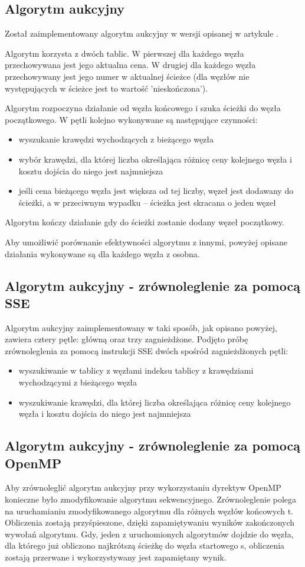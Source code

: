 \documentclass[12pt,a4paper]{article}
\begin{document}
\subsection{Algorytm aukcyjny}
Został zaimplementowany algorytm aukcyjny w wersji opisanej w artykule \cite{auction}.

Algorytm korzysta z dwóch tablic. W pierwszej dla każdego węzła przechowywana jest jego aktualna cena. W drugiej dla każdego węzła przechowywany jest jego numer w aktualnej ścieżce (dla węzłów nie występujących w ścieżce jest to wartość 'nieskończona').

Algorytm rozpoczyna działanie od węzła końcowego i szuka ścieżki do węzła początkowego. W pętli kolejno wykonywane są następujące czynności: 
\begin{itemize}
\item wyszukanie krawędzi wychodzących z bieżącego węzła
\item wybór krawędzi, dla której liczba określająca różnicę ceny kolejnego węzła i kosztu dojścia do niego jest najmniejsza
\item jeśli cena bieżącego węzła jest większa od tej liczby, węzeł jest dodawany do ścieżki, a w przeciwnym wypadku -- ścieżka jest skracana o jeden węzeł
\end{itemize}
Algorytm kończy działanie gdy do ścieżki zostanie dodany węzeł początkowy.

Aby umożliwić porównanie efektywności algorytmu z innymi, powyżej opisane działania wykonywane są dla każdego węzła z osobna.
\subsection{Algorytm aukcyjny - zrównoleglenie za pomocą SSE}
Algorytm aukcyjny zaimplementowany w taki sposób, jak opisano powyżej, zawiera cztery pętle: główną oraz trzy zagnieżdżone. Podjęto próbę zrównoleglenia za pomocą instrukcji SSE dwóch spośród zagnieżdżonych pętli:
\begin{itemize}
\item wyszukiwanie w tablicy z węzłami indeksu tablicy z krawędziami wychodzącymi z bieżącego węzła
\item wyszukiwanie krawędzi, dla której liczba określająca różnicę ceny kolejnego węzła i kosztu dojścia do niego jest najmniejsza
\end{itemize}
\subsection{Algorytm aukcyjny - zrównoleglenie za pomocą OpenMP}
Aby zrównoleglić algorytm aukcyjny przy wykorzystaniu dyrektyw OpenMP konieczne było zmodyfikowanie algorytmu sekwencyjnego. Zrównoleglenie polega na uruchamianiu zmodyfikowanego algorytmu dla różnych węzłów końcowych t. Obliczenia zostają przyśpieszone, dzięki zapamiętywaniu wyników zakończonych wywołań algorytmu. Gdy, jeden z uruchomionych algorytmów dojdzie do węzła, dla którego już obliczono najkrótszą ścieżkę do węzła startowego s, obliczenia zostają przerwane i wykorzystywany jest zapamiętany wynik.
\end{document}
